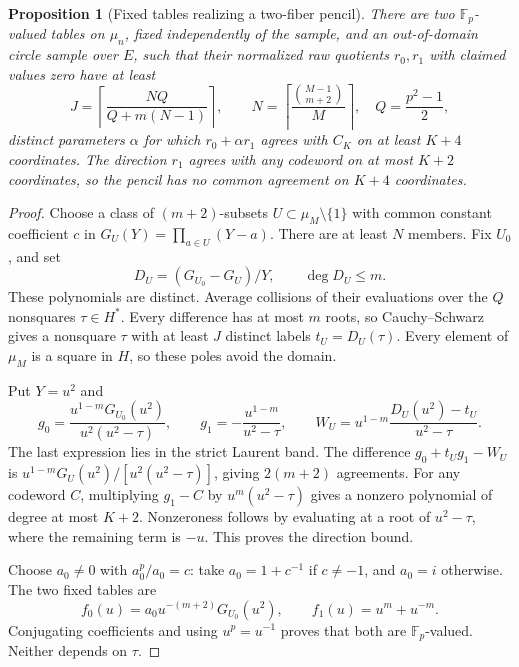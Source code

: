 \documentclass[11pt,letterpaper]{article}
\newtheorem{proposition}[theorem]{Proposition}
\theoremstyle{definition}
\theoremstyle{remark}
\begin{document}
\begin{proposition}[Fixed tables realizing a two-fiber pencil]
There are two $\mathbb F_p$-valued tables on $\mu_n$, fixed independently
of the sample, and an out-of-domain circle sample over $E$, such that
their normalized raw quotients $r_0,r_1$ with claimed values zero have
at least
\[
 J=\left\lceil\frac{NQ}{Q+m(N-1)}\right\rceil,\qquad
 N=\left\lceil\frac{\binom{M-1}{m+2}}M\right\rceil,\quad
 Q=\frac{p^2-1}{2},
\]
distinct parameters $\alpha$ for which $r_0+\alpha r_1$ agrees with
$C_K$ on at least $K+4$ coordinates. The direction $r_1$ agrees with
any codeword on at most $K+2$ coordinates, so the pencil has no common
agreement on $K+4$ coordinates.
\end{proposition}
\begin{proof}
Choose a class of $(m+2)$-subsets $U\subset\mu_M\setminus\{1\}$ with
common constant coefficient $c$ in $G_U(Y)=\prod_{a\in U}(Y-a)$.
There are at least $N$ members. Fix $U_0$, and set
\[
 D_U=(G_{U_0}-G_U)/Y,\qquad \deg D_U\le m.
\]
These polynomials are distinct. Average collisions of their evaluations
over the $Q$ nonsquares $\tau\in H^*$. Every difference has at most
$m$ roots, so Cauchy--Schwarz gives a nonsquare $\tau$ with at least
$J$ distinct labels $t_U=D_U(\tau)$. Every element of $\mu_M$ is a
square in $H$, so these poles avoid the domain.

Put $Y=u^2$ and
\[
 g_0=\frac{u^{1-m}G_{U_0}(u^2)}{u^2(u^2-\tau)},\qquad
 g_1=-\frac{u^{1-m}}{u^2-\tau},\qquad
 W_U=u^{1-m}\frac{D_U(u^2)-t_U}{u^2-\tau}.
\]
The last expression lies in the strict Laurent band. The difference
$g_0+t_Ug_1-W_U$ is
$u^{1-m}G_U(u^2)/[u^2(u^2-\tau)]$, giving $2(m+2)$ agreements.
For any codeword $C$, multiplying $g_1-C$ by $u^m(u^2-\tau)$ gives
a nonzero polynomial of degree at most $K+2$. Nonzeroness follows
by evaluating at a root of $u^2-\tau$, where the remaining term is $-u$.
This proves the direction bound.

Choose $a_0\ne0$ with $a_0^p/a_0=c$: take $a_0=1+c^{-1}$ if
$c\ne-1$, and $a_0=i$ otherwise. The two fixed tables are
\[
 f_0(u)=a_0u^{-(m+2)}G_{U_0}(u^2),\qquad
 f_1(u)=u^m+u^{-m}.
\]
Conjugating coefficients and using $u^p=u^{-1}$ proves that both
are $\mathbb F_p$-valued. Neither depends on $\tau$.


\end{proof}
\end{document}
